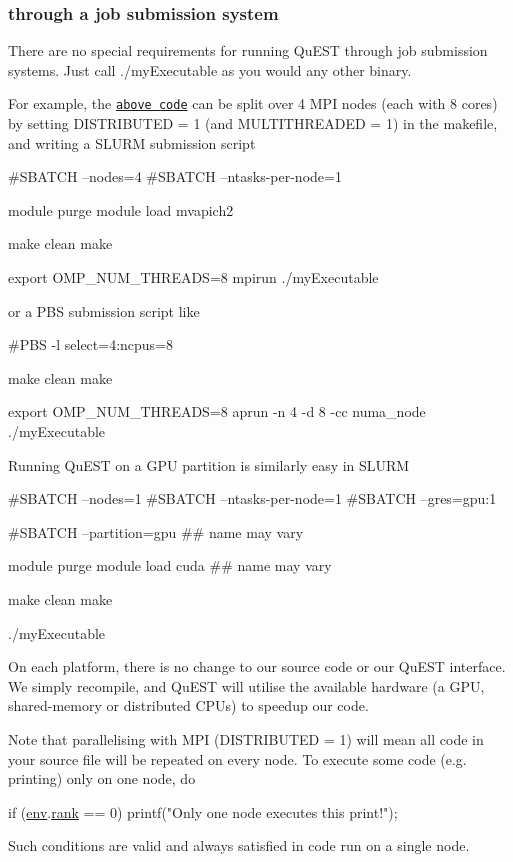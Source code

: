 \subsubsection*{through a job submission system}

There are no special requirements for running Qu\+E\+ST through job submission systems. Just call {\ttfamily ./my\+Executable} as you would any other binary.

For example, the \href{tutorial_example.c}{\tt above code} can be split over 4 M\+PI nodes (each with 8 cores) by setting {\ttfamily D\+I\+S\+T\+R\+I\+B\+U\+T\+ED = 1} (and {\ttfamily M\+U\+L\+T\+I\+T\+H\+R\+E\+A\+D\+ED = 1}) in the makefile, and writing a S\+L\+U\+RM submission script 
\begin{DoxyCode}
#SBATCH --nodes=4
#SBATCH --ntasks-per-node=1

module purge
module load mvapich2

make clean
make

export OMP\_NUM\_THREADS=8
mpirun ./myExecutable
\end{DoxyCode}
 or a P\+BS submission script like 
\begin{DoxyCode}
#PBS -l select=4:ncpus=8

make clean
make

export OMP\_NUM\_THREADS=8
aprun -n 4 -d 8 -cc numa\_node ./myExecutable
\end{DoxyCode}


Running Qu\+E\+ST on a G\+PU partition is similarly easy in S\+L\+U\+RM 
\begin{DoxyCode}
#SBATCH --nodes=1
#SBATCH --ntasks-per-node=1
#SBATCH --gres=gpu:1 

#SBATCH --partition=gpu    ## name may vary

module purge
module load cuda  ## name may vary

make clean
make

./myExecutable
\end{DoxyCode}


On each platform, there is no change to our source code or our Qu\+E\+ST interface. We simply recompile, and Qu\+E\+ST will utilise the available hardware (a G\+PU, shared-\/memory or distributed C\+P\+Us) to speedup our code.

Note that parallelising with M\+PI ({\ttfamily D\+I\+S\+T\+R\+I\+B\+U\+T\+ED = 1}) will mean all code in your source file will be repeated on every node. To execute some code (e.\+g. printing) only on one node, do 
\begin{DoxyCode}
\textcolor{keywordflow}{if} (\mbox{\hyperlink{runTests_8c_a5fd8ba97fcae3408ae6221dfc3cc1f93}{env}}.\mbox{\hyperlink{structQuESTEnv_aa648bb336cf8598467cb62db00b9cee8}{rank}} == 0)
    printf(\textcolor{stringliteral}{"Only one node executes this print!"});
\end{DoxyCode}
 Such conditions are valid and always satisfied in code run on a single node. 